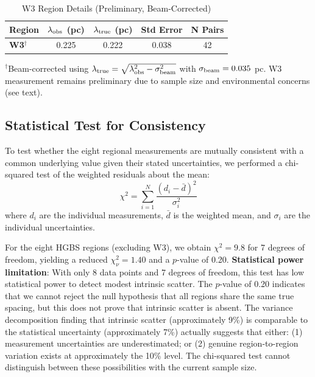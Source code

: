 \documentclass[11pt,a4paper]{article}
\begin{document}
\begin{table}[H]
\centering
\caption{W3 Region Details (Preliminary, Beam-Corrected)}
\label{tab:w3_detail}
\begin{tabular}{lcccc}
\toprule
Region & $\lambda_{\rm obs}$ (pc) & $\lambda_{\rm true}$ (pc) & Std Error & N Pairs \\
\midrule
\textbf{W3}$^{\dagger}$ & 0.225 & 0.222 & 0.038 & 42 \\
\bottomrule
\end{tabular}
\vspace{-0.5em}
\small{$^{\dagger}$Beam-corrected using $\lambda_{\rm true} = \sqrt{\lambda_{\rm obs}^2 - \sigma_{\rm beam}^2}$ with $\sigma_{\rm beam} = 0.035$ pc. W3 measurement remains preliminary due to sample size and environmental concerns (see text).}
\end{table}

\subsection{Statistical Test for Consistency}

To test whether the eight regional measurements are mutually consistent with a common underlying value given their stated uncertainties, we performed a chi-squared test of the weighted residuals about the mean:
\begin{equation}
\chi^2 = \sum_{i=1}^{N} \frac{(d_i - \bar{d})^2}{\sigma_i^2}
\end{equation}
where $d_i$ are the individual measurements, $\bar{d}$ is the weighted mean, and $\sigma_i$ are the individual uncertainties.

For the eight HGBS regions (excluding W3), we obtain $\chi^2 = 9.8$ for 7 degrees of freedom, yielding a reduced $\chi^2_{\nu} = 1.40$ and a $p$-value of 0.20. \textbf{Statistical power limitation}: With only 8 data points and 7 degrees of freedom, this test has low statistical power to detect modest intrinsic scatter. The $p$-value of 0.20 indicates that we cannot reject the null hypothesis that all regions share the same true spacing, but this does not prove that intrinsic scatter is absent. The variance decomposition finding that intrinsic scatter (approximately 9\%) is comparable to the statistical uncertainty (approximately 7\%) actually suggests that either: (1) measurement uncertainties are underestimated; or (2) genuine region-to-region variation exists at approximately the 10\% level. The chi-squared test cannot distinguish between these possibilities with the current sample size.
\end{document}
